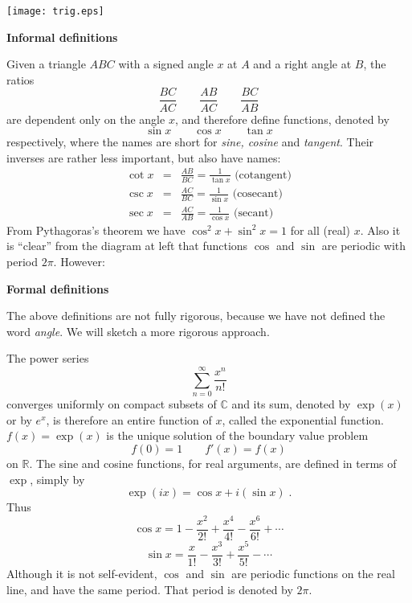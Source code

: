 \documentclass[12pt]{article}
\begin{document}
\texttt{[image: trig.eps]}

\textbf{Informal definitions}

Given a triangle $ABC$ with a signed angle $x$ at $A$ and a
right angle at $B$, the ratios
$$\frac{BC}{AC}\qquad \frac{AB}{AC}\qquad \frac{BC}{AB}$$
are dependent only on the angle $x$, and therefore define functions,
denoted by
$$\sin x\qquad \cos x\qquad \tan x$$
respectively, where the names are short for \emph{sine, cosine} and
\emph{tangent}. Their inverses are rather less important,
but also have names:
\begin{eqnarray*}
\cot x &=& \frac{AB}{BC} = \frac{1}{\tan x} \text{  (cotangent)} \\
\csc x &=& \frac{AC}{BC} = \frac{1}{\sin x} \text{  (cosecant)} \\
\sec x &=& \frac{AC}{AB} = \frac{1}{\cos x} \text{  (secant)}
\end{eqnarray*}
From Pythagoras's theorem we have $\cos^2 x+\sin^2 x = 1$ for all (real) $x$.
Also it is ``clear'' from the diagram at left that functions $\cos$ and $\sin$
are periodic with period $2\pi$. However:

\textbf{Formal definitions}

The above definitions are not fully rigorous, because we have not defined
the word \emph{angle}. We will sketch a more rigorous approach.

The power series
$$\sum_{n=0}^\infty\frac{x^n}{n!}$$
converges uniformly on compact subsets of $\mathbb{C}$ and its sum,
denoted by $\exp(x)$ or by $e^x$, is therefore an entire function of $x$,
called the exponential function.
$f(x)=\exp(x)$ is the unique solution of the boundary value problem
$$f(0)=1\qquad f'(x)=f(x)$$
on $\mathbb{R}$.
The sine and cosine functions, for real arguments, are defined in terms
of $\exp$, simply by
$$\exp(ix)=\cos x + i(\sin x)\;.$$
Thus
$$\cos x = 1-\frac{x^2}{2!}+\frac{x^4}{4!}-\frac{x^6}{6!}+\cdots$$
$$\sin x = \frac{x}{1!}-\frac{x^3}{3!}+\frac{x^5}{5!}-\cdots$$
Although it is not self-evident, $\cos$ and $\sin$ are periodic functions on
the real line, and have the same period. That period is denoted by $2\pi$.
\end{document}
